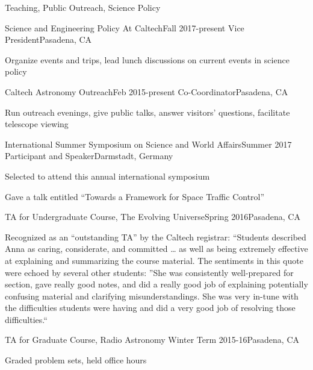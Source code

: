 \documentclass{resume} %
\begin{document}
\begin{rSection}{Teaching, Public Outreach, Science Policy}

  \begin{rSubsection}{Science and Engineering Policy At Caltech}{Fall 2017-present}
    {Vice President}{Pasadena, CA}
  \item Organize events and trips,
    lead lunch discussions on current events in science policy
  \end{rSubsection}

  \begin{rSubsection}{Caltech Astronomy Outreach}{Feb 2015-present}
    {Co-Coordinator}{Pasadena, CA}
  \item Run outreach evenings, give public talks, answer visitors' questions, 
    facilitate telescope viewing
  \end{rSubsection}

  \begin{rSubsection}{International Summer Symposium on Science and World Affairs}{Summer 2017}
      {Participant and Speaker}{Darmstadt, Germany}
    \item Selected to attend this annual international symposium
    \item Gave a talk entitled ``Towards a Framework for Space Traffic Control''
  \end{rSubsection}

  \begin{rSubsection}
    {TA for Undergraduate Course, The Evolving Universe}{Spring 2016}{}{Pasadena, CA}
  \item Recognized as an ``outstanding TA'' by the Caltech registrar:
    ``Students described Anna as caring, considerate, and committed \ldots 
    as well as being extremely effective at explaining and summarizing the 
    course material. The sentiments in this quote were echoed by several other 
    students: ''She was consistently well-prepared for section, 
    gave really good notes, and did a really good job of explaining 
    potentially confusing material and clarifying misunderstandings. 
    She was very in-tune with the difficulties students were having 
    and did a very good job of resolving those difficulties.``
  \end{rSubsection}


  \begin{rSubsection}{TA for Graduate Course, Radio Astronomy}
    {Winter Term 2015-16}{}{Pasadena, CA}
  \item Graded problem sets, held office hours
  \end{rSubsection}


\end{rSection}
\end{document}
